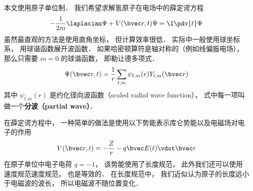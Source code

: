 

本文使用原子单位制． 我们希望求解氢原子在电场中的薛定谔方程
\begin{equation}\label{HyTDSE_eq7}
-\frac{1}{2m}\laplacian \Psi + V(\bvec r, t)\Psi = \I \pdv{t}\Psi
\end{equation}
虽然最直观的方法是使用直角坐标， 但计算效率很低． 实际中一般使用球坐标系， 用球谐函数展开波函数． 如果哈密顿算符是轴对称的（例如线偏振电场）， 那么只需要 $m = 0$ 的球谐函数， 即勒让德多项式．
\begin{equation}\label{HyTDSE_eq3}
\Psi(\bvec r, t) = \frac{1}{r}\sum_{l,m} \psi_{l,m}(r) Y_{l,m}(\bvec r)
\end{equation}
其中 $\psi_{l,m}(r)$ 是约化径向波函数（scaled radial wave function）， 式中每一项叫做一个\textbf{分波（partial wave）}．

在薛定谔方程中， 一种简单的做法是使用以下势能表示库仑势能以及电磁场对电子的作用
\begin{equation}\label{HyTDSE_eq8}
V(\bvec r, t) = -\frac{Z}{r} - q\bvec E(t) \vdot \bvec r
\end{equation}
在原子单位中电子电荷 $q = -1$， 该势能使用了长度规范， 此外我们还可以使用速度规范速度规范， 也是等效的． 在长度规范中， 我们近似认为原子的长度远小于电磁波的波长， 所以电磁波不随位置变化．

